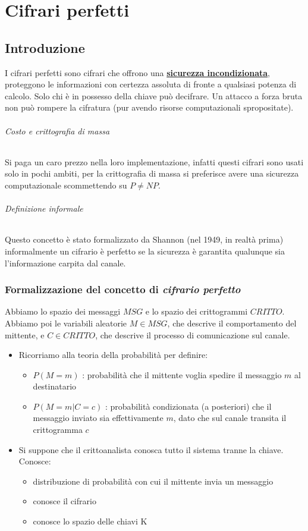 \part{Cifrari perfetti}
\chapter{Introduzione}
I cifrari perfetti sono cifrari che offrono una \underline{\textbf{sicurezza incondizionata}}, proteggono le informazioni con certezza assoluta di fronte a qualsiasi potenza di calcolo. Solo chi è in possesso della chiave può decifrare. Un attacco a forza bruta non può rompere la cifratura (pur avendo risorse computazionali spropositate).

\paragraph{Costo e crittografia di massa} Si paga un caro prezzo nella loro implementazione, infatti questi cifrari sono usati solo in pochi ambiti,
per la crittografia di massa si preferisce avere una sicurezza computazionale scommettendo su $P \neq NP$.

\paragraph{Definizione informale} Questo concetto è stato formalizzato da Shannon (nel 1949, in realtà prima) informalmente un cifrario è perfetto se la sicurezza è garantita qualunque sia l'informazione carpita dal canale.
\section{Formalizzazione del concetto di \emph{cifrario perfetto}}
Abbiamo lo spazio dei messaggi $MSG$ e lo spazio dei crittogrammi $CRITTO$. Abbiamo poi le variabili aleatorie $M \in MSG$, che descrive il comportamento del mittente, e $C \in CRITTO$, che descrive il processo di comunicazione sul canale. \begin{itemize}
	\item Ricorriamo alla teoria della probabilità per definire:
	\begin{itemize}
		\item $P(M=m)$ : probabilità che il mittente voglia spedire il messaggio $m$ al destinatario
		\item$ P(M=m | C=c)$ : probabilità condizionata (a posteriori) che il messaggio inviato sia effettivamente $m$, dato che sul canale transita il crittogramma $c$
	\end{itemize}
\item Si suppone che il crittoanalista conosca tutto il sistema tranne la chiave. Conosce:
\begin{itemize}
	\item distribuzione di probabilità con cui il mittente invia un messaggio
	\item conosce il cifrario
	\item conosce lo spazio delle chiavi K
\end{itemize}
\end{itemize}
